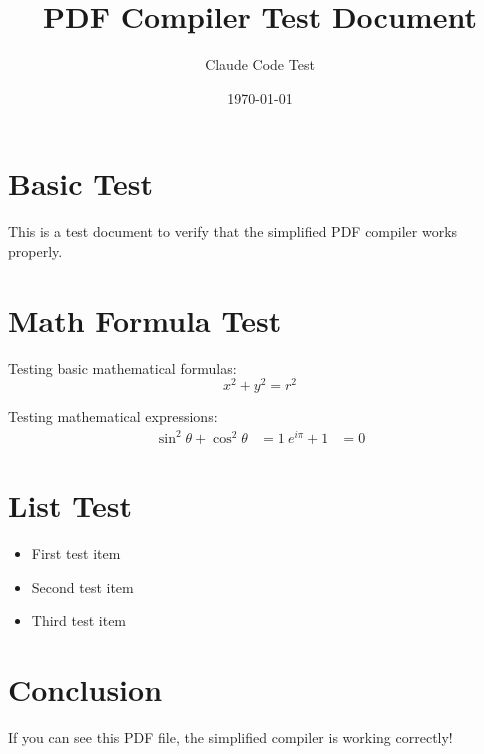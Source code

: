 \documentclass[12pt]{article}
\title{PDF Compiler Test Document}
\author{Claude Code Test}
\date{\today}
\begin{document}
\maketitle

\section{Basic Test}

This is a test document to verify that the simplified PDF compiler works properly.

\section{Math Formula Test}

Testing basic mathematical formulas:
\begin{equation}
x^2 + y^2 = r^2
\end{equation}

Testing mathematical expressions:
\begin{align}
\sin^2\theta + \cos^2\theta &= 1 \
e^{i\pi} + 1 &= 0
\end{align}

\section{List Test}

\begin{itemize}
\item First test item
\item Second test item  
\item Third test item
\end{itemize}

\section{Conclusion}

If you can see this PDF file, the simplified compiler is working correctly!
\end{document}
